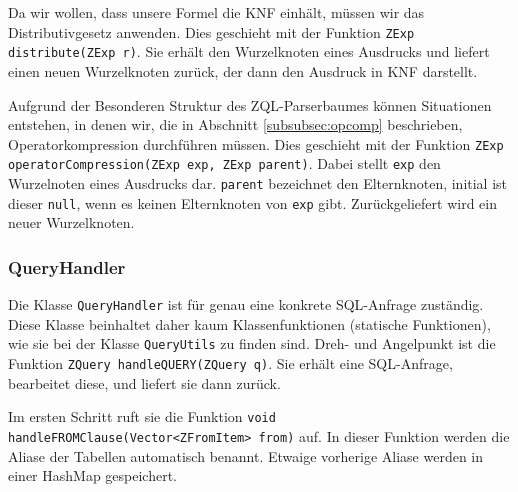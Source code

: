 Da wir wollen, dass unsere Formel die KNF einhält, müssen wir das Distributivgesetz anwenden. Dies geschieht mit der Funktion \verb|ZExp distribute(ZExp r)|. Sie erhält den Wurzelknoten eines Ausdrucks und liefert einen neuen Wurzelknoten zurück, der dann den Ausdruck in KNF darstellt.

Aufgrund der Besonderen Struktur des ZQL-Parserbaumes können Situationen entstehen, in denen wir, die in Abschnitt \ref{subsubsec:opcomp} beschrieben, Operatorkompression durchführen müssen. Dies geschieht mit der Funktion \verb|ZExp operatorCompression(ZExp exp, ZExp parent)|. Dabei stellt \verb|exp| den Wurzelnoten eines Ausdrucks dar. \verb|parent| bezeichnet den Elternknoten, initial ist dieser \verb|null|, wenn es keinen Elternknoten von \verb|exp| gibt. Zurückgeliefert wird ein neuer Wurzelknoten.

\subsubsection{QueryHandler}

Die Klasse \verb|QueryHandler| ist für genau eine konkrete SQL-Anfrage zuständig. Diese Klasse beinhaltet daher kaum Klassenfunktionen (statische Funktionen), wie sie bei der Klasse \verb|QueryUtils| zu finden sind. Dreh- und Angelpunkt ist die Funktion \verb|ZQuery handleQUERY(ZQuery q)|. Sie erhält eine SQL-Anfrage, bearbeitet diese, und liefert sie dann zurück. 

Im ersten Schritt ruft sie die Funktion \verb|void handleFROMClause(Vector<ZFromItem> from)| auf. In dieser Funktion werden die Aliase der Tabellen automatisch benannt. Etwaige vorherige Aliase werden in einer HashMap gespeichert.

